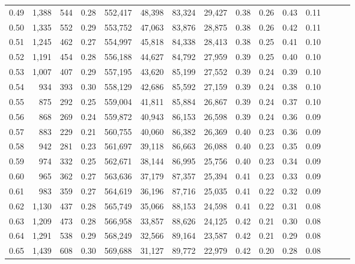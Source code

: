 \begin{tabular}{rrrrrrrrrrrrrrr}
0.49 &   1,388 &    544 &  0.28 &  552,417 &   48,398 &   83,324 &   29,427 &  0.38 &  0.26 &  0.43 &      0.11 \\
0.50 &   1,335 &    552 &  0.29 &  553,752 &   47,063 &   83,876 &   28,875 &  0.38 &  0.26 &  0.42 &      0.11 \\
0.51 &   1,245 &    462 &  0.27 &  554,997 &   45,818 &   84,338 &   28,413 &  0.38 &  0.25 &  0.41 &      0.10 \\
0.52 &   1,191 &    454 &  0.28 &  556,188 &   44,627 &   84,792 &   27,959 &  0.39 &  0.25 &  0.40 &      0.10 \\
0.53 &   1,007 &    407 &  0.29 &  557,195 &   43,620 &   85,199 &   27,552 &  0.39 &  0.24 &  0.39 &      0.10 \\
0.54 &     934 &    393 &  0.30 &  558,129 &   42,686 &   85,592 &   27,159 &  0.39 &  0.24 &  0.38 &      0.10 \\
0.55 &     875 &    292 &  0.25 &  559,004 &   41,811 &   85,884 &   26,867 &  0.39 &  0.24 &  0.37 &      0.10 \\
0.56 &     868 &    269 &  0.24 &  559,872 &   40,943 &   86,153 &   26,598 &  0.39 &  0.24 &  0.36 &      0.09 \\
0.57 &     883 &    229 &  0.21 &  560,755 &   40,060 &   86,382 &   26,369 &  0.40 &  0.23 &  0.36 &      0.09 \\
0.58 &     942 &    281 &  0.23 &  561,697 &   39,118 &   86,663 &   26,088 &  0.40 &  0.23 &  0.35 &      0.09 \\
0.59 &     974 &    332 &  0.25 &  562,671 &   38,144 &   86,995 &   25,756 &  0.40 &  0.23 &  0.34 &      0.09 \\
0.60 &     965 &    362 &  0.27 &  563,636 &   37,179 &   87,357 &   25,394 &  0.41 &  0.23 &  0.33 &      0.09 \\
0.61 &     983 &    359 &  0.27 &  564,619 &   36,196 &   87,716 &   25,035 &  0.41 &  0.22 &  0.32 &      0.09 \\
0.62 &   1,130 &    437 &  0.28 &  565,749 &   35,066 &   88,153 &   24,598 &  0.41 &  0.22 &  0.31 &      0.08 \\
0.63 &   1,209 &    473 &  0.28 &  566,958 &   33,857 &   88,626 &   24,125 &  0.42 &  0.21 &  0.30 &      0.08 \\
0.64 &   1,291 &    538 &  0.29 &  568,249 &   32,566 &   89,164 &   23,587 &  0.42 &  0.21 &  0.29 &      0.08 \\
0.65 &   1,439 &    608 &  0.30 &  569,688 &   31,127 &   89,772 &   22,979 &  0.42 &  0.20 &  0.28 &      0.08 \\

\end{tabular}
